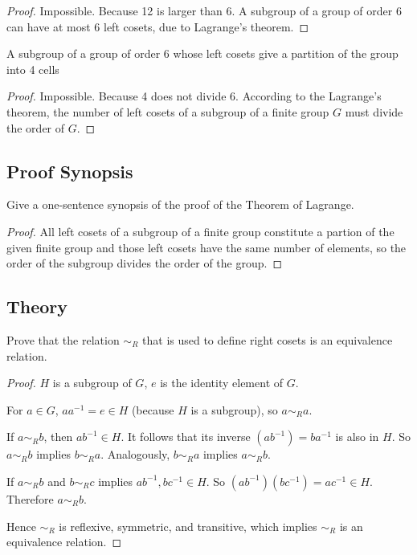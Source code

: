 \begin{proof}
    Impossible. Because 12 is larger than 6. A subgroup of a group of order 6 can have at most 6 left cosets, due to Lagrange's theorem.
\end{proof}

\newpage
\begin{exercise}
    A subgroup of a group of order 6 whose left cosets give a partition of the group into 4 cells
\end{exercise}

\begin{proof}
    Impossible. Because 4 does not divide 6. According to the Lagrange's theorem, the number of left cosets of a subgroup of a finite group $G$ must divide the order of $G$.
\end{proof}

\subsection*{Proof Synopsis}

\newpage
\begin{exercise}
    Give a one-sentence synopsis of the proof of the Theorem of Lagrange.
\end{exercise}

\begin{proof}
    All left cosets of a subgroup of a finite group constitute a partion of the given finite group and those left cosets have the same number of elements, so the order of the subgroup divides the order of the group.
\end{proof}

\subsection*{Theory}

\newpage
\begin{exercise}
    Prove that the relation ${\sim}_{R}$ that is used to define right cosets is an equivalence relation.
\end{exercise}

\begin{proof}
    $H$ is a subgroup of $G$, $e$ is the identity element of $G$.

    For $a\in G$, $aa^{-1} = e\in H$ (because $H$ is a subgroup), so $a {\sim}_{R} a$.

    If $a {\sim}_{R} b$, then $ab^{-1}\in H$. It follows that its inverse ${(ab^{-1})} = ba^{-1}$ is also in $H$. So $a {\sim}_{R} b$ implies $b {\sim}_{R} a$. Analogously, $b {\sim}_{R} a$ implies $a {\sim}_{R} b$.

    If $a {\sim}_{R} b$ and $b {\sim}_{R} c$ implies $ab^{-1}, bc^{-1}\in H$. So $(ab^{-1})(bc^{-1}) = ac^{-1}\in H$. Therefore $a {\sim}_{R} b$.

    Hence ${\sim}_{R}$ is reflexive, symmetric, and transitive, which implies ${\sim}_{R}$ is an equivalence relation.
\end{proof}

